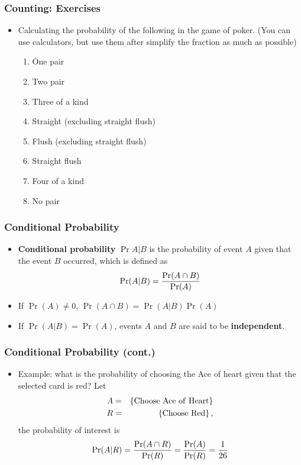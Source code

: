 \documentclass[pdflatex, 12pt]{beamer}
\begin{document}
\begin{frame}
\frametitle{Counting: Exercises}
\begin{itemize}
\item Calculating the probability of the following in the game of poker. (You can use calculators, but use them after simplify the fraction as much as possible)
 \begin{enumerate}
 \item One pair
 \item Two pair
 \item Three of a kind
 \item Straight (excluding straight flush)
 \item Flush (excluding straight flush)
 \item Straight flush
 \item Four of a kind
 \item No pair
 \end{enumerate}
\end{itemize}
\end{frame}

\begin{frame}
\frametitle{Conditional Probability}
\begin{itemize}
\item \textbf{Conditional probability} $\Pr{A|B}$ is the probability of event $A$ given that the event $B$ occurred, which is defined as 
 \begin{equation}
 \Pr(A|B) = \frac{\Pr(A \cap B)}{\Pr(A)} \notag
 \end{equation}
\vspace{0.2cm}
\item If $\Pr(A) \neq 0$, $\Pr(A \cap B) = \Pr(A|B)\Pr(A)$
\vspace{0.4cm}
\item If $\Pr(A|B) = \Pr(A)$, events $A$ and $B$ are said to be \textbf{independent}.
\end{itemize}
\end{frame}

\begin{frame}
\frametitle{Conditional Probability (cont.)}
\begin{itemize}
\item Example: what is the probability of choosing the Ace of heart given that the selected card is red? Let
 \begin{eqnarray}
 A &=& \left\{\mathrm{Choose \ Ace \ of \ Heart}\right\} \notag \\
 R &=& \left\{\mathrm{Choose \ Red}\right\}, \notag
 \end{eqnarray}
the probability of interest is 
 \begin{equation}
 \Pr(A|R) = \frac{\Pr(A \cap R)}{\Pr(R)} = \frac{\Pr(A)}{\Pr(R)} = \frac{1}{26} \notag
 \end{equation}
\end{itemize}
\end{frame}
\end{document}
